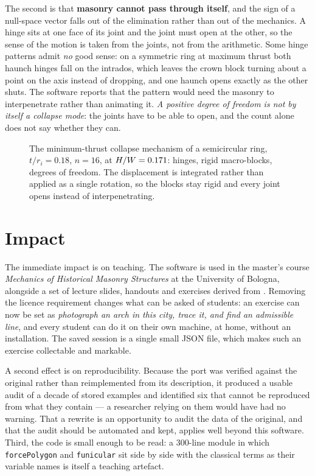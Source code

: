 \documentclass[final,3p,times,twocolumn]{elsarticle}
\begin{document}
The second is that \textbf{masonry cannot pass through itself}, and the sign of
a null-space vector falls out of the elimination rather than out of the
mechanics. A hinge sits at one face of its joint and the joint must open at the
other, so the sense of the motion is taken from the joints, not from the
arithmetic. Some hinge patterns admit \emph{no} good sense: on a symmetric ring
at maximum thrust both haunch hinges fall on the intrados, which leaves the
crown block turning about a point on the axis instead of dropping, and one
haunch opens exactly as the other shuts. The software reports that the pattern
would need the masonry to interpenetrate rather than animating it. \emph{A
positive degree of freedom is not by itself a collapse mode}: the joints have
to be able to open, and the count alone does not say whether they can.

\begin{figure}[t]
\centering

\caption{The minimum-thrust collapse mechanism of a semicircular ring,
  $t/r_i = 0.18$, $n = 16$, at $H/W = 0.171$: \mechHinges{} hinges,
  \mechBodies{} rigid macro-blocks, \mechDof{} degrees of freedom. The
  displacement is integrated rather than applied as a single rotation, so the
  blocks stay rigid and every joint opens instead of interpenetrating.}
\label{fig:mechanism}
\end{figure}


\section{Impact}

The immediate impact is on teaching. The software is used in the master's
course \emph{Mechanics of Historical Masonry Structures} at the University of
Bologna, alongside a set of lecture slides, handouts and exercises derived from
\cite{CastellazziTaliercio2025}. Removing the licence requirement changes what
can be asked of students: an exercise can now be set as \emph{photograph an
arch in this city, trace it, and find an admissible line}, and every student
can do it on their own machine, at home, without an installation. The saved
session is a single small JSON file, which makes such an exercise collectable
and markable.

A second effect is on reproducibility. Because the port was verified against
the original rather than reimplemented from its description, it produced a
usable audit of a decade of stored examples and identified six that cannot be
reproduced from what they contain --- a researcher relying on them would have
had no warning. That a rewrite is an opportunity to audit the data of the
original, and that the audit should be automated and kept, applies well beyond
this software. Third, the code is small enough to be read: a 300-line module in
which \texttt{forcePolygon} and \texttt{funicular} sit side by side with the
classical terms as their variable names is itself a teaching artefact.
\end{document}

